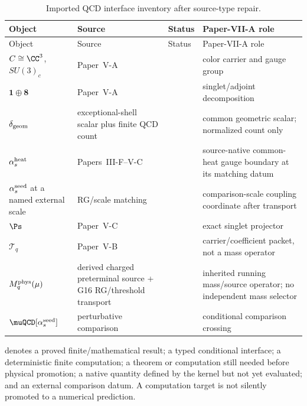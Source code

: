 \documentclass[12pt,a4paper]{article}
\providecommand{\deltageom}{\delta_{\rm geom}}
\providecommand{\alphasseed}{\alpha_s^{\rm seed}}
\begin{document}
\begin{longtable}{>{\raggedright\arraybackslash}p{} >{\raggedright\arraybackslash}p{} >{\raggedright\arraybackslash}p{} >{\raggedright\arraybackslash}p{}}
\caption[Imported QCD interface inventory]{Imported QCD interface inventory after source-type repair.}\label{p10:tab:qcd-interface-inventory}\\
\toprule
Object & Source & Status & Paper-VII-A role \\
\midrule
\endfirsthead
\toprule Object & Source & Status & Paper-VII-A role \\ \midrule
\endhead
\(C\cong\CC^3\), \(SU(3)_c\) & Paper~V-A & \RowTheorem{} & color carrier and gauge group \\
\(\mathbf1\oplus\mathbf8\) & Paper~V-A & \RowTheorem{} & singlet/adjoint decomposition \\
\(\deltageom\) & exceptional-shell scalar plus finite QCD count & \RowTheorem{} & common geometric scalar; normalized count only \\
\(\alpha_s^{\rm heat}\) & Papers~III-F--V-C & \RowTheorem{} & source-native common-heat gauge boundary at its matching datum \\
\(\alphasseed\) at a named external scale & RG/scale matching & \RowBridge{} & comparison-scale coupling coordinate after transport \\
\(\Ps\) & Paper~V-C & \RowTheorem{} & exact singlet projector \\
\(\mathcal T_q\) & Paper~V-B & \RowBridge{} & carrier/coefficient packet, not a mass operator \\
\(M_q^{\rm phys}(\mu)\) & derived charged preterminal source + G16 RG/threshold transport & \RowBridge{} & inherited running mass/source operator; no independent mass selector \\
\(\muQCD[\alphasseed]\) & perturbative comparison & \RowBridge{} & conditional comparison crossing \\
\bottomrule
\end{longtable}

\begin{definition}
\label{p10:def:logical-status-classes}
\RowTheorem{} denotes a proved finite/mathematical result; \RowBridge{} a typed conditional interface; \RowConstructive{} a deterministic finite computation; \RowObligation{} a theorem or computation still needed before physical promotion; \RowTarget{} a native quantity defined by the kernel but not yet evaluated; and \RowValidation{} an external comparison datum.  A computation target is not silently promoted to a numerical prediction.
\end{definition}
\end{document}
